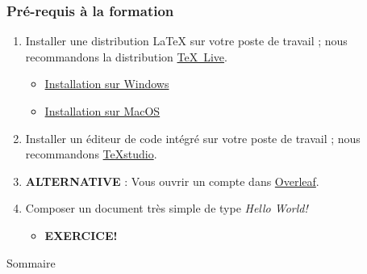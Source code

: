 
\begin{frame}
	
	\frametitle{Pré-requis à la formation}
	
	\begin{enumerate}
		
		\item Installer une distribution {\LaTeX} sur votre poste de travail ; nous
		recommandons la distribution \href{https://www.tug.org/texlive/}{\TeX\ Live}.
		
			\begin{itemize}
				\item \href{https://youtu.be/7MfodhaghUk}{Installation sur Windows}
				\item \href{https://youtu.be/kA53EQ3Q47w}{Installation sur MacOS}
			\end{itemize}
		
		\item Installer un éditeur de code intégré sur votre poste de travail ; nous recommandons
		\href{https://www.texstudio.org/}{\TeX studio}.
		
		\item \textbf{ALTERNATIVE} : Vous ouvrir un compte dans \href{https://www.overleaf.com/}{Overleaf}.
		
		\item Composer un document très simple de type \emph{Hello World!}
		
			\begin{itemize}
				\item \textbf{EXERCICE!}
			\end{itemize}
	\end{enumerate}
	
\end{frame}


\begin{frame}{Sommaire}
	\tableofcontents
\end{frame}